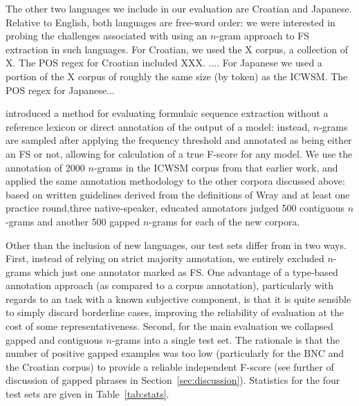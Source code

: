\documentclass[11pt,letterpaper]{article}
\newcommand{\tabref}[2][]{Table#1~\ref{#2}\xspace}
\newcommand{\secref}[2][]{Section#1~\ref{#2}\xspace}
\begin{document}
The other two languages we include in our evaluation are Croatian and Japanese. Relative to English, both languages are free-word order: we were interested in probing the challenges associated with using an $n$-gram approach to FS extraction in such languages. For Croatian, we used the X corpus, a collection of X. The POS regex for Croatian included XXX. .... For Japanese we used a portion of the X corpus of roughly the same size (by token) as the ICWSM. The POS regex for Japanese...

 introduced a method for evaluating formulaic sequence extraction without a reference lexicon or direct annotation of the output of a model: instead, $n$-grams are sampled after applying the frequency threshold and annotated as being either an FS or not, allowing for calculation of a true F-score for any model. We use the annotation of 2000 $n$-grams in the ICWSM corpus from that earlier work, and applied the same annotation methodology to the other corpora discussed above: based on written guidelines derived from the definitions of Wray \cite{Wray08} and at least one practice round,three native-speaker, educated annotators judged 500 contiguous $n$-grams and another 500 gapped $n$-grams for each of the new corpora. 

Other than the inclusion of new languages, our test sets differ from  in two ways. First, instead of relying on strict majority annotation, we entirely excluded $n$-grams which just one annotator marked as FS. One advantage of a type-based annotation approach (as compared to a corpus annotation), particularly with regards to an task with a known subjective component, is that it is quite sensible to simply discard borderline cases, improving the reliability of evaluation at the cost of some representativeness.  Second, for the main evaluation we collapsed gapped and contiguous $n$-grams into a single test set. The rationale is that the number of positive gapped examples was too low (particularly for the BNC and the Croatian corpus) to provide a reliable independent F-score (see further of discussion of gapped phrases in \secref{sec:discussion}). Statistics for the four test sets are given in \tabref{tab:stats}.
\end{document}
